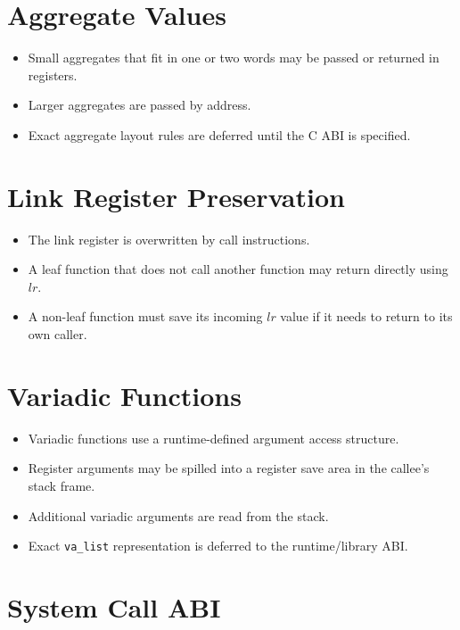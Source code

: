 \section{Aggregate Values}

\begin{itemize}
  \item Small aggregates that fit in one or two words may be passed or returned in registers.
  \item Larger aggregates are passed by address.
  \item Exact aggregate layout rules are deferred until the C ABI is specified.
\end{itemize}

\section{Link Register Preservation}

\begin{itemize}
  \item The link register is overwritten by call instructions.
  \item A leaf function that does not call another function may return directly using \(lr\).
  \item A non-leaf function must save its incoming \(lr\) value if it needs to return to its own caller.
\end{itemize}

\section{Variadic Functions}

\begin{itemize}
  \item Variadic functions use a runtime-defined argument access structure.
  \item Register arguments may be spilled into a register save area in the callee's stack frame.
  \item Additional variadic arguments are read from the stack.
  \item Exact \texttt{va\_list} representation is deferred to the runtime/library ABI.
\end{itemize}

\section{System Call ABI}

